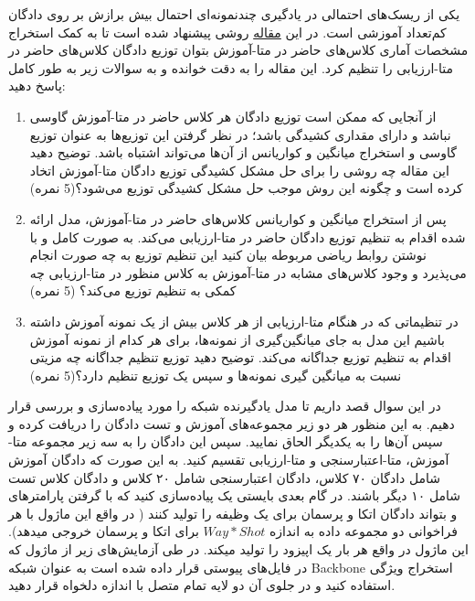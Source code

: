 \documentclass{article}
\begin{document}
یکی از ریسک‌های احتمالی در یادگیری چندنمونه‌ای احتمال بیش برازش 
بر روی دادگان کم‌تعداد آموزشی است. در این
\href{https://arxiv.org/abs/2101.06395}{مقاله}
روشی پیشنهاد شده است تا به کمک استخراج مشخصات آماری کلاس‌های حاضر در متا-آموزش بتوان توزیع دادگان کلاس‌های حاضر در متا-ارزیابی را تنظیم کرد. این مقاله را به دقت خوانده و به سوالات زیر به طور کامل پاسخ دهید:

\begin{enumerate}

\item
از آنجایی که ممکن است توزیع دادگان هر کلاس حاضر در متا-آموزش گاوسی نباشد و دارای مقداری کشیدگی باشد؛ در نظر گرفتن این توزیع‌ها به عنوان توزیع گاوسی و استخراج میانگین و کواریانس از آن‌ها می‌تواند اشتباه باشد. توضیح دهید این مقاله چه روشی را برای حل مشکل کشیدگی توزیع دادگان متا-آموزش اتخاد کرده است و چگونه این روش موجب حل مشکل کشیدگی توزیع می‌شود؟(5 نمره)

\item
پس از استخراج میانگین و کواریانس کلاس‌های حاضر در متا-آموزش، مدل ارائه شده اقدام به تنظیم توزیع دادگان حاضر در متا-ارزیابی می‌کند. به صورت کامل و با نوشتن روابط ریاضی مربوطه بیان کنید این تنظیم توزیع به چه صورت انجام می‌پذیرد و وجود کلاس‌های مشابه در متا-آموزش به کلاس منظور در متا-ارزیابی چه کمکی به تنظیم توزیع می‌کند؟ (5 نمره)

\item
در تنظیماتی که در هنگام متا-ارزیابی از هر کلاس بیش از یک نمونه آموزش داشته باشیم این مدل به جای میانگین‌گیری از نمونه‌ها، برای هر کدام از 
نمونه آموزش اقدام به تنظیم توزیع جداگانه می‌کند. توضیح دهید توزیع تنظیم جداگانه چه مزیتی نسبت به میانگین گیری نمونه‌ها و سپس یک توزیع تنظیم دارد؟(5 نمره)

\end{enumerate}



در این سوال قصد داریم تا مدل یادگیرنده
شبکه
\href{https://arxiv.org/abs/1703.05175}{}
را مورد پیاده‌سازی و بررسی قرار دهیم. به این منظور هر دو زیر مجموعه‌های آموزش و تست دادگان
را دریافت کرده و سپس آن‌ها را به یکدیگر الحاق نمایید. 
سپس این دادگان را به سه زیر مجموعه
متا-آموزش، متا-اعتبارسنجی
 و متا-ارزیابی تقسیم کنید. به این صورت که دادگان آموزش شامل دادگان ۷۰ کلاس، دادگان اعتبارسنجی شامل ۲۰ کلاس و دادگان  کلاس تست شامل ۱۰ دیگر باشند.
در گام بعدی بایستی یک 
پیاده‌سازی کنید که با گرفتن پارامترهای
و
بتواند دادگان
اتکا و پرسمان برای یک وظیفه را تولید کنند ( در واقع این ماژول با هر فراخوانی دو مجموعه داده به اندازه
$Way * Shot$
برای اتکا و پرسمان خروجی میدهد). این ماژول در واقع هر بار یک اپیزود را تولید میکند.
در طی آزمایش‌های زیر از ماژول
که در فایل‌های پیوستی قرار داده شده است به عنوان شبکه Backbone استخراج ویژگی استفاده کنید و در جلوی آن دو لایه تمام متصل
 با اندازه دلخواه قرار دهید.
\end{document}
